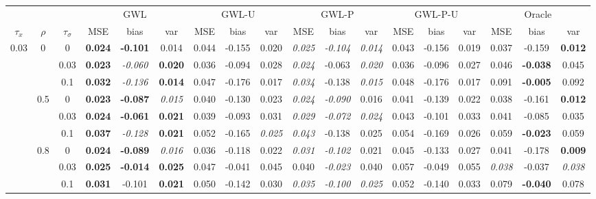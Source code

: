 \documentclass[authoryear, review, 10pt]{elsarticle}
\begin{document}
\begin{sidewaystable}[ht]
\begin{center}
\begin{tabular}{ccc|ccc|ccc|ccc|ccc|ccc}
&&&\multicolumn{3}{c}{GWL}&\multicolumn{3}{c}{GWL-U}&\multicolumn{3}{c}{GWL-P}&\multicolumn{3}{c}{GWL-P-U}&\multicolumn{3}{c}{Oracle}\\
$\tau_x$ & $\rho$ & $\tau_\sigma$ & MSE & bias & var &  MSE & bias & var &  MSE & bias & var &  MSE & bias & var &  MSE & bias & var\\ 
\hline
\multirow{9}{*}{0.03} & \multirow{3}{*}{0} & 0 & \textbf{0.024} & \textbf{-0.101} & 0.014 & 0.044 & -0.155 & 0.020 & \emph{0.025} & \emph{-0.104} & \emph{0.014} & 0.043 & -0.156 & 0.019 & 0.037 & -0.159 & \textbf{0.012} \\ 
 &  & 0.03 &   \textbf{0.023} & \emph{-0.060} & \textbf{0.020} & 0.036 & -0.094 & 0.028 & \emph{0.024} & -0.063 & \emph{0.020} & 0.036 & -0.096 & 0.027 & 0.046 & \textbf{-0.038} & 0.045 \\ 
 &  & 0.1 &   \textbf{0.032} & \emph{-0.136} & \textbf{0.014} & 0.047 & -0.176 & 0.017 & \emph{0.034} & -0.138 & \emph{0.015} & 0.048 & -0.176 & 0.017 & 0.091 & \textbf{-0.005} & 0.092 \\ \cline{2-18}
 & \multirow{3}{*}{0.5} & 0 &   \textbf{0.023} & \textbf{-0.087} & \emph{0.015} & 0.040 & -0.130 & 0.023 & \emph{0.024} & \emph{-0.090} & 0.016 & 0.041 & -0.139 & 0.022 & 0.038 & -0.161 & \textbf{0.012} \\ 
 &  & 0.03 &   \textbf{0.024} & \textbf{-0.061} & \textbf{0.021} & 0.039 & -0.093 & 0.031 & \emph{0.029} & \emph{-0.072} & \emph{0.024} & 0.043 & -0.101 & 0.033 & 0.041 & -0.085 & 0.035 \\ 
 &  & 0.1 &   \textbf{0.037} & \emph{-0.128} & \textbf{0.021} & 0.052 & -0.165 & \emph{0.025} & \emph{0.043} & -0.138 & 0.025 & 0.054 & -0.169 & 0.026 & 0.059 & \textbf{-0.023} & 0.059 \\ \cline{2-18}
 & \multirow{3}{*}{0.8} & 0 &   \textbf{0.024} & \textbf{-0.089} & \emph{0.016} & 0.036 & -0.118 & 0.022 & \emph{0.031} & \emph{-0.102} & 0.021 & 0.045 & -0.133 & 0.027 & 0.041 & -0.178 & \textbf{0.009} \\ 
 &  & 0.03 &   \textbf{0.025} & \textbf{-0.014} & \textbf{0.025} & 0.047 & -0.041 & 0.045 & 0.040 & \emph{-0.023} & 0.040 & 0.057 & -0.049 & 0.055 & \emph{0.038} & -0.037 & \emph{0.038} \\ 
 &  & 0.1 &   \textbf{0.031} & -0.101 & \textbf{0.021} & 0.050 & -0.142 & 0.030 & \emph{0.035} & \emph{-0.100} & \emph{0.025} & 0.052 & -0.140 & 0.033 & 0.079 & \textbf{-0.040} & 0.078 \\ \cline{1-18}

\end{tabular}
\end{center}
\end{sidewaystable}
\end{document}
